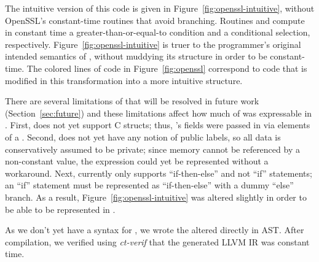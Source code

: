 The intuitive version of this code is given in Figure~\ref{fig:openssl-intuitive}, without OpenSSL's constant-time routines that avoid branching. Routines  and  compute in constant time a greater-than-or-equal-to condition and a conditional selection, respectively. Figure~\ref{fig:openssl-intuitive} is truer to the programmer's original intended semantics of , without muddying its structure in order to be constant-time. The colored lines of code in Figure~\ref{fig:openssl} correspond to code that is modified in this transformation into a more intuitive structure.

There are several limitations of \constc that will be resolved in future work (Section~\ref{sec:future}) and these limitations affect how much of  was expressable in \constc. First, \constc does not yet support C structs; thus, 's fields were passed in via elements of a \bytearray. Second, \constc does not yet have any notion of public labels, so all data is conservatively assumed to be private; since memory cannot be referenced by a non-constant value, the expression  could yet be represented without a workaround. Next, \constc currently only supports ``if-then-else'' and not ``if'' statements; an ``if'' statement must be represented as ``if-then-else'' with a dummy ``else'' branch.
As a result, Figure~\ref{fig:openssl-intuitive} was altered slightly in order to be able to be represented in \constc.

As we don't yet have a syntax for \constc, we wrote the altered 
directly in \constc AST. After compilation, we verified using \emph{ct-verif} that the generated LLVM IR was constant time.
